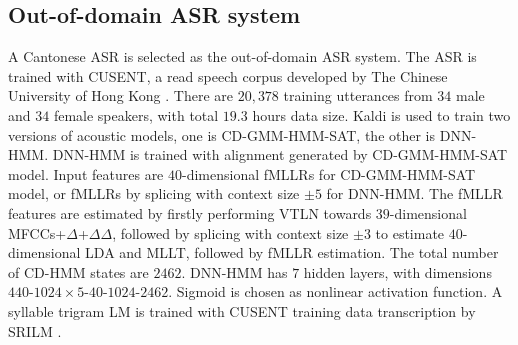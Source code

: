 \documentclass[a4paper]{article}
\begin{document}
\subsection{Out-of-domain ASR system}
\label{subsec:ood_asr}
A Cantonese ASR is selected as the out-of-domain ASR system. 
The ASR is trained with CUSENT, a read speech corpus developed by The Chinese University of Hong Kong \cite{LeeLoChingEtAl2002}. There are $20,378$ training utterances from $34$ male and $34$ female speakers, with total $19.3$ hours data size. Kaldi \cite{povey2011kaldi} is used to train two versions of acoustic models, one is CD-GMM-HMM-SAT, the other is DNN-HMM.  
DNN-HMM is trained with alignment generated by CD-GMM-HMM-SAT model.
Input features are $40$-dimensional fMLLRs for CD-GMM-HMM-SAT model, or fMLLRs by splicing with context size $\pm 5$ for DNN-HMM. The fMLLR features are estimated by firstly performing VTLN towards $39$-dimensional MFCCs+$\Delta$+$\Delta\Delta$, followed by splicing with context size $\pm 3$ to estimate $40$-dimensional LDA and MLLT, followed by fMLLR estimation. The total number of CD-HMM states are $2462$. DNN-HMM has $7$ hidden layers, with dimensions $440$-$1024\times 5$-$40$-$1024$-$2462$. Sigmoid  is chosen as nonlinear activation function.
A syllable trigram LM is trained with CUSENT training data transcription by SRILM \cite{Stolcke02srilm--}.
\end{document}
